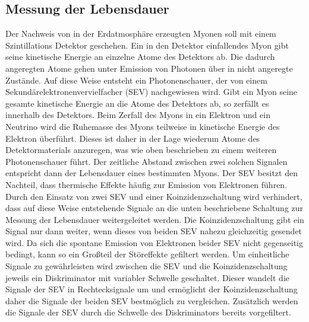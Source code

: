 \subsection{Messung der Lebensdauer}
\label{subsec:Messung der Lebensdauer}
Der Nachweis von in der Erdatmosphäre erzeugten Myonen soll mit einem Szintillations Detektor geschehen.
Ein in den Detektor einfallendes Myon gibt seine kinetische Energie an einzelne Atome des Detektors ab.
Die dadurch angeregten Atome gehen unter Emission von Photonen über in nicht angeregte Zustände.
Auf diese Weise entsteht ein Photonenschauer, der von einem Sekundärelektronenvervielfacher (SEV) nachgewiesen wird.
Gibt ein Myon seine gesamte kinetische Energie an die Atome des Detektors ab, so zerfällt es innerhalb des Detektors.
Beim Zerfall des Myons in ein Elektron und ein Neutrino wird die Ruhemasse des Myons teilweise in kinetische Energie des Elektron überführt.
Dieses ist daher in der Lage wiederum Atome des Detektormaterials anzuregen, was wie oben beschrieben zu einem weiteren Photonenschauer führt.
Der zeitliche Abstand zwischen zwei solchen Signalen entspricht dann der Lebensdauer eines bestimmten Myons.
Der SEV besitzt den Nachteil, dass thermische Effekte häufig zur Emission von Elektronen führen.
Durch den Einsatz von zwei SEV und einer Koinzidenzschaltung wird verhindert, dass auf diese Weise entstehende Signale an die unten beschriebene Schaltung zur Messung der Lebensdauer weitergeleitet werden.
Die Koinzidenzschaltung gibt ein Signal nur dann weiter, wenn dieses von beiden SEV nahezu gleichzeitig gesendet wird.
Da sich die spontane Emission von Elektronen beider SEV nicht gegenseitig bedingt, kann so ein Großteil der Störeffekte gefiltert werden.
Um einheitliche Signale zu gewährleisten wird zwischen die SEV und die Koinzidenzschaltung jeweils ein Diskriminator mit variabler Schwelle geschaltet.
Dieser wandelt die Signale der SEV in Rechtecksignale um und ermöglicht der Koinzidenzschaltung daher die Signale der beiden SEV bestmöglich zu vergleichen.
Zusätzlich werden die Signale der SEV durch die Schwelle des Diskriminators bereits vorgefiltert.

